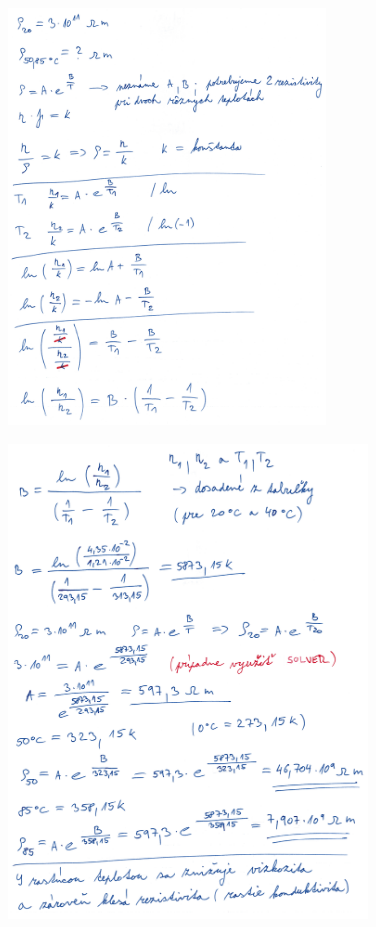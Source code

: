 \begin{figure}[h]
    \centering
    \includegraphics*[width=0.75\textwidth]{images/diel5.jpg}
\end{figure}

\newpage

\begin{figure}[h]
    \centering
    \includegraphics*[width=0.85\textwidth]{images/diel5_1.jpg}
\end{figure}

